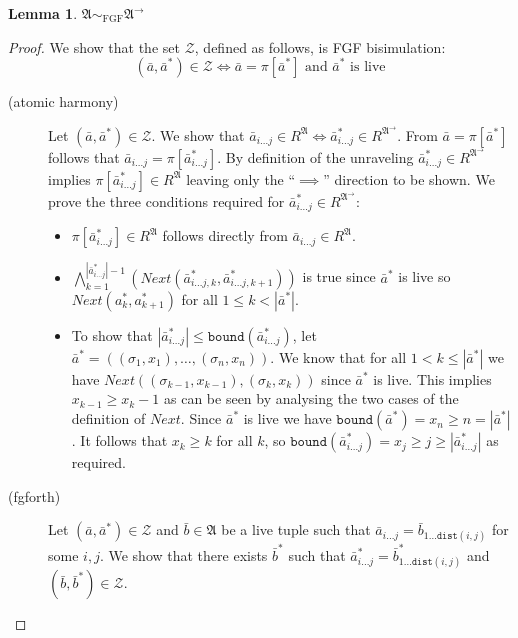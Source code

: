 \documentclass[draft]{scrartcl}
\theoremstyle{definition}
\newtheorem{lemma}[theorem]{Lemma}
\newcommand{\str}[1]{\mathfrak{#1}}
\newcommand{\dist}[2]{\mathtt{dist}({#1},{#2})}
\newcommand{\nextrel}[2]{\mathit{Next}({#1},{#2})}
\newcommand{\sij}{_{i\ldots{}j}}
\begin{document}
\begin{lemma}
  $\str{A} \sim_{\mathrm{FGF}} \str{A}^{\rightarrow{}}$
\end{lemma}
\begin{proof}
  We show that the set $\mathcal{Z}$, defined as follows, is FGF bisimulation:
  \begin{equation*}
    (\bar{a}, \bar{a}^{*}) \in \mathcal{Z} \iff
    \bar{a} = \pi[\bar{a}^{*}] \text{\ and\ }
    \bar{a}^{*} \text{\ is live}
  \end{equation*}

  \begin{description}
    \item[(atomic harmony)]
          Let $(\bar{a}, \bar{a}^{*}) \in \mathcal{Z}$.
          We show that $\bar{a}_{i\ldots{}j} \in R^{\str{A}} \iff \bar{a}^{*}_{i\ldots{}j} \in R^{\str{A}^{\rightarrow}}$.
          From $\bar{a} = \pi[\bar{a}^{*}]$ follows that $\bar{a}_{i\ldots{}j} = \pi[\bar{a}^{*}_{i\ldots{}j}]$.
          By definition of the unraveling $\bar{a}^{*}_{i\ldots{}j} \in R^{\str{A}^{\rightarrow}}$ implies $\pi[\bar{a}^{*}_{i\ldots{}j}] \in R^{\str{A}}$ leaving only the ``$\implies$'' direction to be shown.
          We prove the three conditions required for $\bar{a}^{*}_{i\ldots{}j} \in R^{\str{A}^{\rightarrow}}$:
          \begin{itemize}
            \item
                  $\pi[\bar{a}^{*}_{i\ldots{}j}] \in R^{\mathfrak{A}}$ follows directly from $\bar{a}_{i\ldots{}j} \in R^{\mathfrak{A}}$.
            \item
                  $\bigwedge_{k=1}^{|\bar{a}^{*}_{i\ldots{}j}|-1}{(\nextrel{\bar{a}^{*}_{i\ldots{}j,k}}{{}\bar{a}^{*}_{i\ldots{}j,k+1}})}$ is true since $\bar{a}^{*}$ is live so $\nextrel{a^{*}_{k}}{a^{*}_{k+1}}$ for all $1 \le k < |\bar{a}^{*}|$.
            \item
                  To show that $|\bar{a}^{*}_{i\ldots{j}}| \le \mathtt{bound}(\bar{a}^{*}_{i\ldots{}j})$, let $\bar{a}^{*} = ((\sigma_{1}, x_{1}), \ldots{}, (\sigma_{n}, x_{n}))$.
                  We know that for all $1 < k \le |\bar{a}^{*}|$ we have $\nextrel{(\sigma_{k-1}, x_{k-1})}{(\sigma_{k}, x_{k})}$ since $\bar{a}^{*}$ is live.
                  This implies $x_{k-1} \ge x_{k} - 1$ as can be seen by analysing the two cases of the definition of $\mathit{Next}$.
                  Since $\bar{a}^{*}$ is live we have $\mathtt{bound}(\bar{a}^{*}) = x_{n} \ge n = |\bar{a}^{*}|$.
                  It follows that $x_{k} \ge k$ for all $k$, so $\mathtt{bound}(\bar{a}^{*}_{i\ldots{}j}) = x_{j} \ge j \ge |\bar{a}^{*}_{i\ldots{j}}|$ as required.
          \end{itemize}
    \item[(fgforth)]
          Let $(\bar{a}, \bar{a}^{*}) \in \mathcal{Z}$ and $\bar{b} \in \mathfrak{A}$ be a live tuple such that $\bar{a}\sij = \bar{b}_{1\ldots{}\dist{i}{j}}$ for some $i,j$.
          We show that there exists $\bar{b}^{*}$ such that $\bar{a}^{*}\sij = \bar{b}^{*}_{1\ldots{}\dist{i}{j}}$ and $(\bar{b}, \bar{b}^{*}) \in \mathcal{Z}$.


\end{description}
\end{proof}
\end{document}
